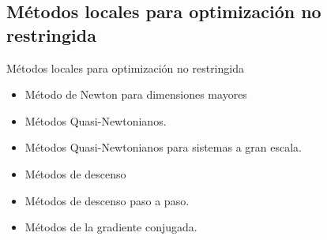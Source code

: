 \documentclass{beamer}
\begin{document}
    \subsection{Métodos locales para optimización no restringida}
        \begin{frame}{Métodos locales para optimización no restringida}
            \begin{itemize}
                \item Método de Newton para dimensiones mayores
                \item Métodos Quasi-Newtonianos.
                \item Métodos Quasi-Newtonianos para sistemas a gran escala.
                \item Métodos de descenso
                \item Métodos de descenso paso a paso.
                
                \item Métodos de la gradiente conjugada.
            \end{itemize}
        \end{frame}
\end{document}
